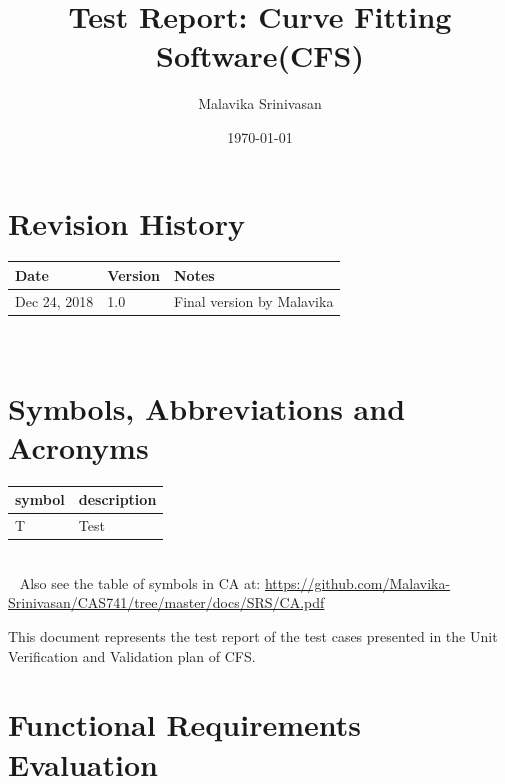 \documentclass[12pt, titlepage]{article}
\newcommand{\famname}{CFS}
\begin{document}
\title{Test Report: Curve Fitting Software(CFS)} 
\author{Malavika Srinivasan}
\date{\today}

\maketitle


\section{Revision History}

\begin{tabularx}{\textwidth}{p{3cm}p{2cm}X}
	\toprule {\bf Date} & {\bf Version} & {\bf Notes}\\
	\midrule
	Dec 24, 2018 & 1.0 & Final version by Malavika \\
	\bottomrule
\end{tabularx}

~\newpage

\section{Symbols, Abbreviations and Acronyms}

\renewcommand{\arraystretch}{1.2}
\begin{tabular}{l l} 
  \toprule		
  \textbf{symbol} & \textbf{description}\\
  \midrule 
  T & Test\\
  \bottomrule
\end{tabular}\\
~\newline
Also see the table of symbols in CA at: 
\url{https://github.com/Malavika-Srinivasan/CAS741/tree/master/docs/SRS/CA.pdf}\\


\newpage

\tableofcontents

\listoftables %

\listoffigures %

\newpage


This document represents the test report of the test cases presented in the 
Unit Verification and Validation plan of \famname{}.

\section{Functional Requirements Evaluation}
\end{document}
